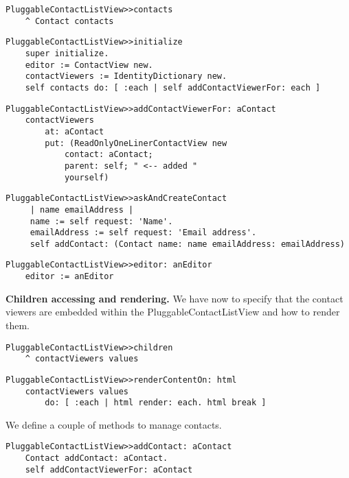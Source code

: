 \documentclass[a4paper,10pt,twoside]{book}
\newcommand{\ct}[1]{{\small\ttfamily\textup{#1}}}
\begin{document}
\begin{lstlisting}
PluggableContactListView>>contacts
    ^ Contact contacts
\end{lstlisting}

\begin{lstlisting}
PluggableContactListView>>initialize
    super initialize.
    editor := ContactView new.
    contactViewers := IdentityDictionary new.
    self contacts do: [ :each | self addContactViewerFor: each ]
\end{lstlisting}

\begin{lstlisting}
PluggableContactListView>>addContactViewerFor: aContact
    contactViewers
        at: aContact
        put: (ReadOnlyOneLinerContactView new
            contact: aContact;
            parent: self; " <-- added "
            yourself)
\end{lstlisting}

\begin{lstlisting}
PluggableContactListView>>askAndCreateContact
     | name emailAddress |
     name := self request: 'Name'.
     emailAddress := self request: 'Email address'.
     self addContact: (Contact name: name emailAddress: emailAddress)
\end{lstlisting}

\begin{lstlisting}
PluggableContactListView>>editor: anEditor
    editor := anEditor
\end{lstlisting}

\textbf{Children accessing and rendering.} We have now to specify that the contact viewers are embedded within the \ct{PluggableContactListView} and how to render them.

\begin{lstlisting}
PluggableContactListView>>children
    ^ contactViewers values
\end{lstlisting}

\begin{lstlisting}
PluggableContactListView>>renderContentOn: html
    contactViewers values
        do: [ :each | html render: each. html break ]
\end{lstlisting}

We define a couple of methods to manage contacts.

\begin{lstlisting}
PluggableContactListView>>addContact: aContact
    Contact addContact: aContact.
    self addContactViewerFor: aContact
\end{lstlisting}
\end{document}
